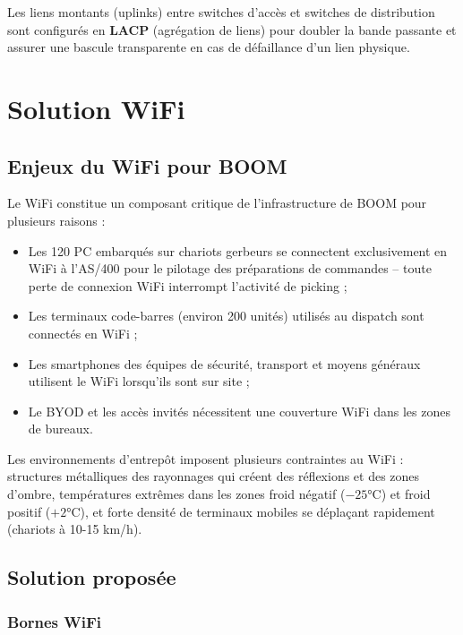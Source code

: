 \documentclass[12pt,a4paper]{report}
\begin{document}
Les liens montants (uplinks) entre switches d'accès et switches de distribution sont configurés en \textbf{LACP} (agrégation de liens) pour doubler la bande passante et assurer une bascule transparente en cas de défaillance d'un lien physique.


\chapter{Solution WiFi}

\section{Enjeux du WiFi pour BOOM}

Le WiFi constitue un composant critique de l'infrastructure de BOOM pour plusieurs raisons :

\begin{itemize}
\item Les 120 PC embarqués sur chariots gerbeurs se connectent exclusivement en WiFi à l'AS/400 pour le pilotage des préparations de commandes -- toute perte de connexion WiFi interrompt l'activité de picking ;
\item Les terminaux code-barres (environ 200 unités) utilisés au dispatch sont connectés en WiFi ;
\item Les smartphones des équipes de sécurité, transport et moyens généraux utilisent le WiFi lorsqu'ils sont sur site ;
\item Le BYOD et les accès invités nécessitent une couverture WiFi dans les zones de bureaux.
\end{itemize}

Les environnements d'entrepôt imposent plusieurs contraintes au WiFi : structures métalliques des rayonnages qui créent des réflexions et des zones d'ombre, températures extrêmes dans les zones froid négatif ($-25$°C) et froid positif ($+2$°C), et forte densité de terminaux mobiles se déplaçant rapidement (chariots à 10-15 km/h).

\section{Solution proposée}

\subsection{Bornes WiFi}
\end{document}
